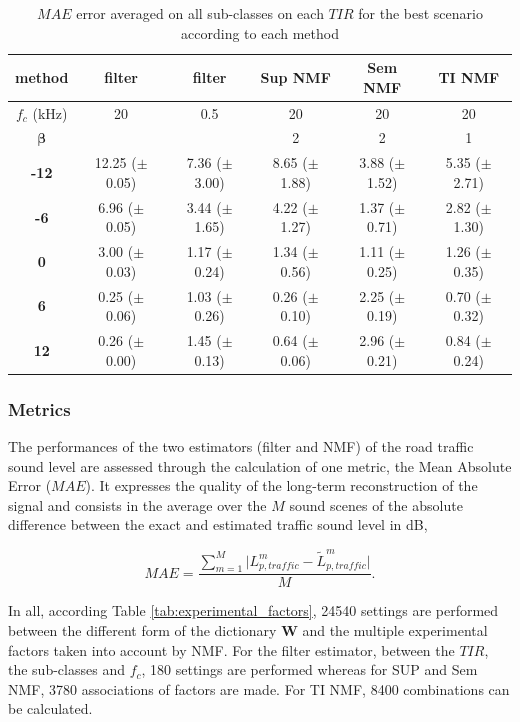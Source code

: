 \documentclass[twocolumn,a4paper,10pt]{article}
\begin{document}
\begin{table}[t]
\centering
\begin{tabular}{@{}cccccc@{}}
\toprule
\textbf{method} & filter & filter & Sup NMF & Sem NMF & TI NMF \\ \midrule
$f_c$ (kHz) & 20 & 0.5 & 20 & 20 & 20 \\
$\mathbf{\beta}$ &  &  & 2 & 2 & 1 \\ \hline
\textbf{-12} & 12.25 ($\pm$ 0.05) & 7.36 ($\pm$ 3.00) & 8.65 ($\pm$ 1.88) & 3.88 ($\pm$ 1.52) & 5.35 ($\pm$ 2.71) \\
\textbf{-6} & 6.96 ($\pm$ 0.05) & 3.44 ($\pm$ 1.65) & 4.22 ($\pm$ 1.27) & 1.37 ($\pm$ 0.71)  & 2.82 ($\pm$ 1.30) \\
\textbf{0} & 3.00 ($\pm$ 0.03) & 1.17 ($\pm$ 0.24) & 1.34 ($\pm$ 0.56) & 1.11 ($\pm$ 0.25) & 1.26 ($\pm$ 0.35) \\
\textbf{6} & 0.25 ($\pm$ 0.06) & 1.03 ($\pm$ 0.26) & 0.26 ($\pm$ 0.10) & 2.25 ($\pm$ 0.19) & 0.70 ($\pm$ 0.32) \\
\textbf{12} & 0.26 ($\pm$ 0.00) & 1.45 ($\pm$ 0.13) & 0.64 ($\pm$ 0.06) & 2.96 ($\pm$ 0.21)  & 0.84 ($\pm$ 0.24) \\ \bottomrule
\end{tabular}
\caption{$MAE$ error averaged on all sub-classes on each $TIR$ for the best scenario according to each method}
\label{tab:results_TIR}
\end{table}


\subsubsection{Metrics}
The performances of the two estimators (filter and NMF) of the road traffic sound level are assessed through the calculation of one metric, the Mean Absolute Error ($MAE$). It expresses the quality of the long-term reconstruction of the signal and consists in the average over the $M$ sound scenes of the absolute difference between the exact and estimated traffic sound level in dB,

\begin{equation}
MAE = \frac{\sum_{m = 1}^M\vert L^m_{p,traffic}-\tilde{L}^m_{p,traffic} \vert}{M}.
\end{equation}

In all, according Table \ref{tab:experimental_factors}, 24540 settings are performed between the different form of the dictionary $\mathbf{W}$ and the multiple experimental factors taken into account by NMF. For the filter estimator, between the $TIR$, the sub-classes and $f_c$, 180 settings are performed whereas for SUP and Sem NMF, 3780 associations of factors are made. For TI NMF, 8400 combinations can be calculated.
\end{document}
